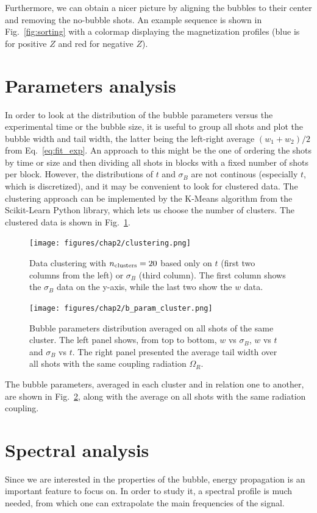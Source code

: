 Furthermore, we can obtain a nicer picture by aligning the bubbles to their center and removing the no-bubble shots.
An example sequence is shown in Fig.\ \ref{fig:sorting} with a colormap displaying the magnetization profiles (blue is for positive $Z$ and red for negative $Z$).

\section{Parameters analysis}
In order to look at the distribution of the bubble parameters versus the experimental time or the bubble size, it is useful to group all shots and plot the bubble width and tail width, the latter being the left-right average $(w_1+w_2)/2$ from Eq.\ \eqref{eq:fit_exp}. 
An approach to this might be the one of ordering the shots by time or size and then dividing all shots in blocks with a fixed number of shots per block. However, the distributions of $t$ and $\sigma_B$ are not continous (especially $t$, which is discretized), and it may be convenient to look for clustered data. 
The clustering approach can be implemented by the K-Means algorithm from the Scikit-Learn Python library, which lets us choose the number of clusters. The clustered data is shown in Fig.\ \ref{fig:clust}. 
\begin{figure}[h!]
    \centering
    \texttt{[image: figures/chap2/clustering.png]}
    \caption{Data clustering with $n_{\rm clusters} = 20$ based only on $t$ (first two columns from the left) or $\sigma_B$ (third column). The first column shows the $\sigma_B$ data on the y-axis, while the last two show the $w$ data.}
    \label{fig:clust}
\end{figure} 
\begin{figure}[h!]
    \centering
    \texttt{[image: figures/chap2/b\_param\_cluster.png]}
    \caption{Bubble parameters distribution averaged on all shots of the same cluster. The left panel shows, from top to bottom, $w$ vs $\sigma_B$, $w$ vs $t$ and $\sigma_B$ vs $t$. The right panel presented the average tail width over all shots with the same coupling radiation $\Omega_R$.}
    \label{fig:b_param}
\end{figure}
The bubble parameters, averaged in each cluster and in relation one to another, are shown in Fig.\ \ref{fig:b_param}, along with the average on all shots with the same radiation coupling.

\section{Spectral analysis}
Since we are interested in the properties of the bubble, energy propagation is an important feature to focus on. In order to study it, a spectral profile is much needed, from which one can extrapolate the main frequencies of the signal. 


